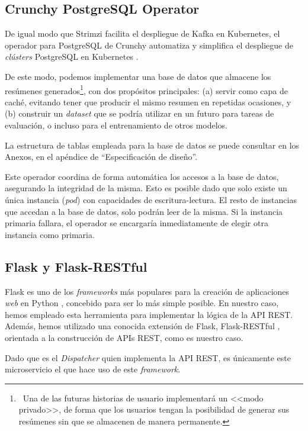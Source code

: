 \subsection{Crunchy PostgreSQL Operator}

De igual modo que Strimzi facilita el despliegue de Kafka en Kubernetes, el operador para PostgreSQL de Crunchy automatiza y simplifica el despliegue de \emph{clústers} PostgreSQL en Kubernetes \cite{crunchy21}.

De este modo, podemos implementar una base de datos que almacene los resúmenes generados\footnote{\, Una de las futuras historias de usuario implementará un <<modo privado>>, de forma que los usuarios tengan la posibilidad de generar sus resúmenes sin que se almacenen de manera permanente.}, con dos propósitos principales: (a) servir como capa de caché, evitando tener que producir el mismo resumen en repetidas ocasiones, y (b) construir un \emph{dataset} que se podría utilizar en un futuro para tareas de evaluación, o incluso para el entrenamiento de otros modelos.

La estructura de tablas empleada para la base de datos se puede consultar en los Anexos, en el apéndice de ``Especificación de diseño''.

Este operador coordina de forma automática los accesos a la base de datos, asegurando la integridad de la misma. Esto es posible dado que solo existe un única instancia (\emph{pod}) con capacidades de escritura-lectura. El resto de instancias que accedan a la base de datos, solo podrán leer de la misma. Si la instancia primaria fallara, el operador se encargaría inmediatamente de elegir otra instancia como primaria.


\subsection{Flask y Flask-RESTful}

Flask es uno de los \emph{frameworks} más populares para la creación de aplicaciones \emph{web} en Python \cite{flask}, concebido para ser lo más simple posible. En nuestro caso, hemos empleado esta herramienta para implementar la lógica de la API REST. Además, hemos utilizado una conocida extensión de Flask, Flask-RESTful \cite{flaskRestful}, orientada a la construcción de APIs REST, como es nuestro caso.

Dado que es el \emph{Dispatcher} quien implementa la API REST, es únicamente este microservicio el que hace uso de este \emph{framework}.


